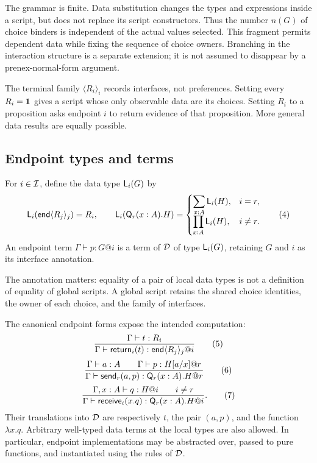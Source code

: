 The grammar is finite. Data substitution changes the types and expressions
inside a script, but does not replace its script constructors. Thus the number
$n(G)$ of choice binders is independent of the actual values selected. This
fragment permits dependent data while fixing the sequence of choice owners.
Branching in the interaction structure is a separate extension; it is not
assumed to disappear by a prenex-normal-form argument.

The terminal family $\langle R_i\rangle_i$ records interfaces, not preferences.
Setting every $R_i=\mathbf 1$ gives a script whose only observable data are its
choices. Setting $R_i$ to a proposition asks endpoint $i$ to return evidence of
that proposition. More general data results are equally possible.

\subsection{Endpoint types and terms}

\begin{definition}
For $i\in\mathcal I$, define the data type $\mathsf L_{i}(G)$ by
\[
 \mathsf L_{i}(\mathsf{end}\langle R_j\rangle_j)=R_i,
 \qquad
 \mathsf L_{i}(\mathsf Q_r(x:A).H)=
 \begin{cases}
   \displaystyle\sum_{x:A}\mathsf L_{i}(H),&i=r,\\[3pt]
   \displaystyle\prod_{x:A}\mathsf L_{i}(H),&i\ne r.
 \end{cases}
 \tag{4}
\]
An endpoint term $\Gamma\vdash p:G@i$ is a term of $\mathcal D$ of type
$\mathsf L_{i}(G)$, retaining $G$ and $i$ as its interface annotation.
\end{definition}

The annotation matters: equality of a pair of local data types is not a
definition of equality of global scripts. A global script retains the shared
choice identities, the owner of each choice, and the family of interfaces.

The canonical endpoint forms expose the intended computation:
\[
 \frac{\Gamma\vdash t:R_i}
      {\Gamma\vdash\mathsf{return}_i(t):\mathsf{end}\langle R_j\rangle_j@i}
 \tag{5}
\]
\[
 \frac{\Gamma\vdash a:A\qquad\Gamma\vdash p:H[a/x]@r}
      {\Gamma\vdash\mathsf{send}_r(a,p):\mathsf Q_r(x:A).H@r}
 \tag{6}
\]
\[
 \frac{\Gamma,x:A\vdash q:H@i\qquad i\ne r}
      {\Gamma\vdash\mathsf{receive}_i(x.q):\mathsf Q_r(x:A).H@i}.
 \tag{7}
\]
Their translations into $\mathcal D$ are respectively $t$, the pair $(a,p)$, and the
function $\lambda x.q$. Arbitrary well-typed data terms at the local types are
also allowed. In particular, endpoint implementations may be abstracted over,
passed to pure functions, and instantiated using the rules of $\mathcal D$.


